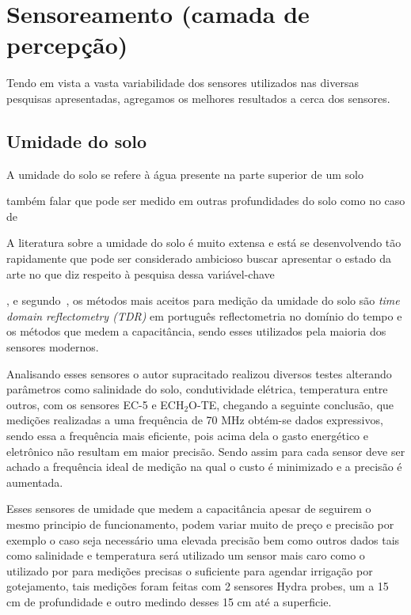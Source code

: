 \documentclass[
article,			%
12pt,				%
oneside,			%
a4paper,			%
english,			%
brazil,				%
sumario=tradicional
]{abntex2}
\begin{document}
\section{Sensoreamento (camada de percepção)}\label{Sensoreamento do solo (camada de percepção)}

Tendo em vista a vasta variabilidade dos sensores utilizados nas diversas pesquisas apresentadas, agregamos os melhores resultados a cerca dos sensores.

\subsection{Umidade do solo}\label{Umidade do solo}

A umidade do solo se refere à água presente na parte superior de um solo\cite{11}

também falar que pode ser medido em outras profundidades do solo como no caso de \citeauthor{12}

A literatura sobre a umidade do solo é muito extensa e está se
desenvolvendo tão rapidamente que pode ser considerado ambicioso buscar apresentar o estado da arte no que diz respeito à pesquisa dessa variável-chave\cite{11}

, e segundo~\citeauthor{3}, os métodos mais aceitos para medição da umidade do solo são \textit{time domain reflectometry (TDR)} em português reflectometria no domínio do tempo e os métodos que medem a capacitância, sendo esses utilizados pela maioria dos sensores modernos.

Analisando esses sensores o autor supracitado\cite{3} realizou diversos testes alterando parâmetros como salinidade do solo, condutividade elétrica, temperatura entre outros, com os sensores EC-5 e ECH$_2$O-TE, chegando a seguinte conclusão, que medições realizadas a uma frequência de 70 MHz obtém-se dados expressivos, sendo essa a frequência mais eficiente, pois acima dela o gasto energético  e eletrônico não resultam em maior precisão. Sendo assim para cada sensor deve ser achado a frequência ideal de medição na qual o custo é minimizado e a precisão é aumentada.

Esses sensores de umidade que medem a capacitância apesar de seguirem o mesmo principio de funcionamento, podem variar muito de preço e precisão por exemplo o caso seja necessário uma elevada precisão bem como outros dados tais como salinidade e temperatura será utilizado um sensor mais caro como o utilizado por \citeauthor{12} para medições precisas o suficiente para agendar irrigação por gotejamento, tais medições foram feitas com 2 sensores Hydra probes, um a 15 cm de profundidade e outro medindo desses 15 cm até a superficie.
\end{document}
